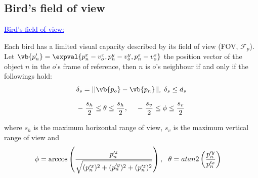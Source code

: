\documentclass{beamer}
\begin{document}
\subsection{Bird's field of view }
\begin{frame}
\textcolor{blue}{\underline{Bird's field of view:}}

Each bird has a limited visual capacity described by its field
of view (FOV, $\mathcal{F}_p$). Let $\vb{p'_n}=\expval{p^x_n-v^x_o,p^y_n-v^y_o,p^z_n-v^z_o}$ the position vector of the object $n$ in the $o$'s frame of reference, then $n$ is $o$'s neighbour if and only if the followings hold:
\begin{equation}
\label{eq:fov1}
	\delta_s = || \vb{p_o} - \vb{p_n} ||,\; \delta_s \leq d_s  \notag 
\end{equation}
 
\begin{equation}
\label{eq:fov2}
	- \; \frac{s_h}{2} \leq \theta \leq \frac{s_h}{2}, \ \ \ \  - \; \frac{s_v}{2} \leq \phi \leq \frac{s_v}{2} \notag
\end{equation}

where $s_h$ is the maximum horizontal range of view, $s_v$ is the maximum vertical range of view and 
\begin{align*}
 &\phi = \arccos
	\left(\frac{p'^z_n}{\sqrt{(p'^x_n)^2 + (p'^y_n)^2 + (p'^z_n)^2}}\right), \ \  
	\theta = atan2 \left(\frac{p'^y_n}{p'^x_n} \right)  \notag
\end{align*}
\end{frame}
\end{document}
